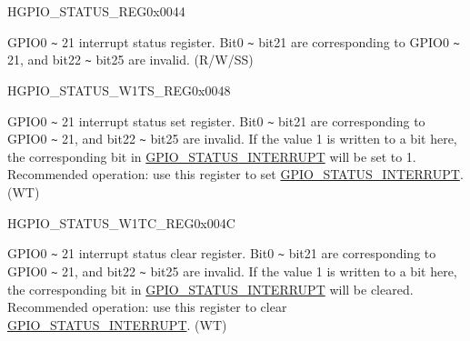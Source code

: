 \begin{register}{H}{GPIO\_STATUS\_REG}{0x0044}\label{regdesc:GPIOSTATUSREG}
%
%
\regnewline%
\begin{regdesc}\begin{reglist}
\label{fielddesc:GPIOSTATUSINTERRUPT}\item [GPIO\_STATUS\_INTERRUPT] GPIO0 \verb+~+ 21 interrupt status register. Bit0 \verb+~+ bit21 are corresponding to GPIO0 \verb+~+ 21, and bit22 \verb+~+ bit25 are invalid. (R/W/SS)
\end{reglist}\end{regdesc}
\end{register}


\begin{register}{H}{GPIO\_STATUS\_W1TS\_REG}{0x0048}\label{regdesc:GPIOSTATUSW1TSREG}
%
%
\regnewline%
\begin{regdesc}\begin{reglist}
\label{fielddesc:GPIOSTATUSW1TS}\item [GPIO\_STATUS\_W1TS] GPIO0 \verb+~+ 21 interrupt status set register. Bit0 \verb+~+ bit21 are corresponding to GPIO0 \verb+~+ 21, and bit22 \verb+~+ bit25 are invalid.  If the value 1 is written to a bit here, the corresponding bit in \hyperref[fielddesc:GPIOSTATUSINTERRUPT]{GPIO\_STATUS\_INTERRUPT} will be set to 1. Recommended operation: use this register to set \hyperref[fielddesc:GPIOSTATUSINTERRUPT]{GPIO\_STATUS\_INTERRUPT}. (WT)
\end{reglist}\end{regdesc}
\end{register}


\begin{register}{H}{GPIO\_STATUS\_W1TC\_REG}{0x004C}\label{regdesc:GPIOSTATUSW1TCREG}
%
%
\regnewline%
\begin{regdesc}\begin{reglist}
\label{fielddesc:GPIOSTATUSW1TC}\item [GPIO\_STATUS\_W1TC] GPIO0 \verb+~+ 21 interrupt status clear register. Bit0 \verb+~+ bit21 are corresponding to GPIO0 \verb+~+ 21, and bit22 \verb+~+ bit25 are invalid.  If the value 1 is written to a bit here, the corresponding bit in \hyperref[fielddesc:GPIOSTATUSINTERRUPT]{GPIO\_STATUS\_INTERRUPT} will be cleared. Recommended operation: use this register to clear \hyperref[fielddesc:GPIOSTATUSINTERRUPT]{GPIO\_STATUS\_INTERRUPT}. (WT)
\end{reglist}\end{regdesc}
\end{register}


